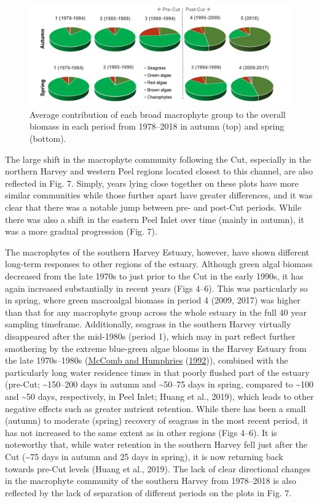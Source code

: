 \documentclass[
]{book}
\begin{document}
\begin{figure}
\includegraphics[width=1\linewidth]{images/macrophytes/picture6} \caption{Average contribution of each broad macrophyte group to the overall biomass in each period from 1978–2018 in autumn (top) and spring (bottom).}\label{fig:macrophytes-pic6}
\end{figure}

The large shift in the macrophyte community following the Cut, especially in the northern Harvey and western Peel regions located closest to this channel, are also reflected in Fig. 7. Simply, years lying close together on these plots have more similar communities while those further apart have greater differences, and it was clear that there was a notable jump between pre- and post-Cut periods. While there was also a shift in the eastern Peel Inlet over time (mainly in autumn), it was a more gradual progression (Fig. 7).

The macrophytes of the southern Harvey Estuary, however, have shown different long-term responses to other regions of the estuary. Although green algal biomass decreased from the late 1970s to just prior to the Cut in the early 1990s, it has again increased substantially in recent years (Figs 4--6). This was particularly so in spring, where green macroalgal biomass in period 4 (2009, 2017) was higher than that for any macrophyte group across the whole estuary in the full 40 year sampling timeframe. Additionally, seagrass in the southern Harvey virtually disappeared after the mid-1980s (period 1), which may in part reflect further smothering by the extreme blue-green algae blooms in the Harvey Estuary from the late 1970s--1980s (\protect\hyperlink{ref-mccomb1992}{McComb and Humphries} (\protect\hyperlink{ref-mccomb1992}{1992})), combined with the particularly long water residence times in that poorly flushed part of the estuary (pre-Cut; \textasciitilde150--200 days in autumn and \textasciitilde50--75 days in spring, compared to \textasciitilde100 and \textasciitilde50 days, respectively, in Peel Inlet; Huang et al., 2019), which leads to other negative effects such as greater nutrient retention. While there has been a small (autumn) to moderate (spring) recovery of seagrass in the most recent period, it has not increased to the same extent as in other regions (Figs 4--6). It is noteworthy that, while water retention in the southern Harvey fell just after the Cut (\textasciitilde75 days in autumn and 25 days in spring), it is now returning back towards pre-Cut levels (Huang et al., 2019). The lack of clear directional changes in the macrophyte community of the southern Harvey from 1978--2018 is also reflected by the lack of separation of different periods on the plots in Fig. 7.
\end{document}
